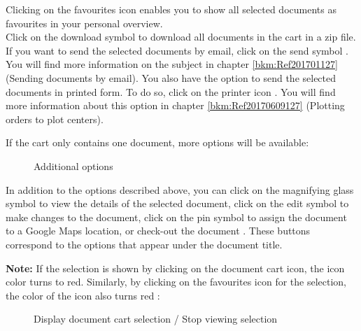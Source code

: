 Clicking on the favourites icon  enables you to show all selected documents as favourites in your personal overview. \\
Click on the download symbol  to download all documents in the cart in a zip file. If you want to send the selected documents by email, click on the send symbol . You will find more information on the subject in chapter \ref{bkm:Ref201701127} (Sending documents by email). You also have the option to send the selected documents in printed form. To do so, click on the printer icon . You will find more information about this option in chapter \ref{bkm:Ref20170609127} (Plotting orders to plot centers).

\vspace{\baselineskip}

If the cart only contains one document, more options will be available:

\begin{figure}[H]
\caption{Additional options}
\end{figure}

In addition to the options described above, you can click on the magnifying glass symbol  to view the details of the selected document, click on the edit symbol  to make changes to the document, click on the pin symbol  to assign the document to a Google Maps location, or check-out the document . These buttons correspond to the options that appear under the document title.

\vspace{\baselineskip}

\textbf{Note:} If the selection is shown by clicking on the document cart icon, the icon color turns to red. Similarly, by clicking on the favourites icon for the selection, the color of the icon also turns red :

\begin{figure}[H]
\caption{Display document cart selection / Stop viewing selection}
\end{figure}


